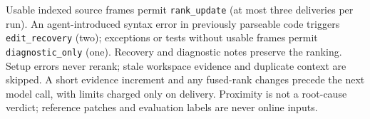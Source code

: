 Usable indexed source frames permit \texttt{rank\_update} (at most three deliveries per run).
An agent-introduced syntax error in previously parseable code triggers \texttt{edit\_recovery}
(two); exceptions or tests without usable frames permit \texttt{diagnostic\_only} (one).
Recovery and diagnostic notes preserve the ranking. Setup errors never rerank; stale
workspace evidence and duplicate context are skipped. A short evidence increment and any
fused-rank changes precede the next model call, with limits charged only on delivery.
Proximity is not a root-cause verdict; reference patches and evaluation labels are never
online inputs.
